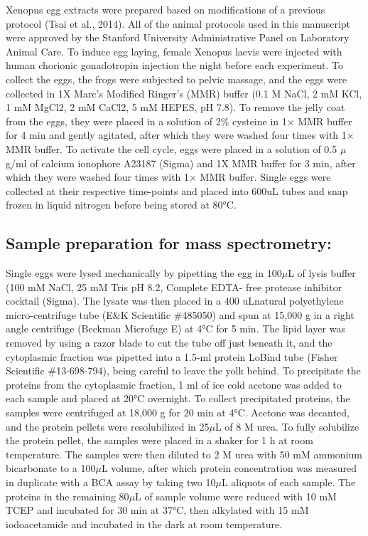 \documentclass[11pt,]{article}
\begin{document}
Xenopus egg extracts were prepared based on modifications of a previous
protocol (Tsai et al., 2014). All of the animal protocols used in this
manuscript were approved by the Stanford University Administrative Panel
on Laboratory Animal Care. To induce egg laying, female Xenopus laevis
were injected with human chorionic gonadotropin injection the night
before each experiment. To collect the eggs, the frogs were subjected to
pelvic massage, and the eggs were collected in 1X Marc's Modified
Ringer's (MMR) buffer (0.1 M NaCl, 2 mM KCl, 1 mM MgCl2, 2 mM CaCl2, 5
mM HEPES, pH 7.8). To remove the jelly coat from the eggs, they were
placed in a solution of 2\% cysteine in 1× MMR buffer for 4 min and
gently agitated, after which they were washed four times with 1× MMR
buffer. To activate the cell cycle, eggs were placed in a solution of
0.5 \(\mu\)g/ml of calcium ionophore A23187 (Sigma) and 1X MMR buffer
for 3 min, after which they were washed four times with 1× MMR buffer.
Single eggs were collected at their respective time-points and placed
into 600uL tubes and snap frozen in liquid nitrogen before being stored
at 80°C.

\hypertarget{sample-preparation-for-mass-spectrometry}{%
\subsection{Sample preparation for mass
spectrometry:}\label{sample-preparation-for-mass-spectrometry}}

Single eggs were lysed mechanically by pipetting the egg in 100\(\mu\)L
of lysis buffer (100 mM NaCl, 25 mM Tris pH 8.2, Complete EDTA- free
protease inhibitor cocktail (Sigma). The lysate was then placed in a 400
uLnatural polyethylene micro-centrifuge tube (E\&K Scientific \#485050)
and spun at 15,000 g in a right angle centrifuge (Beckman Microfuge E)
at 4°C for 5 min. The lipid layer was removed by using a razor blade to
cut the tube off just beneath it, and the cytoplasmic fraction was
pipetted into a 1.5-ml protein LoBind tube (Fisher Scientific
\#13-698-794), being careful to leave the yolk behind. To precipitate
the proteins from the cytoplasmic fraction, 1 ml of ice cold acetone was
added to each sample and placed at 20°C overnight. To collect
precipitated proteins, the samples were centrifuged at 18,000 g for 20
min at 4°C. Acetone was decanted, and the protein pellets were
resolubilized in 25\(\mu\)L of 8 M urea. To fully solubilize the protein
pellet, the samples were placed in a shaker for 1 h at room temperature.
The samples were then diluted to 2 M urea with 50 mM ammonium
bicarbonate to a 100\(\mu\)L volume, after which protein concentration
was measured in duplicate with a BCA assay by taking two 10\(\mu\)L
aliquots of each sample. The proteins in the remaining 80\(\mu\)L of
sample volume were reduced with 10 mM TCEP and incubated for 30 min at
37°C, then alkylated with 15 mM iodoacetamide and incubated in the dark
at room temperature.
\end{document}
